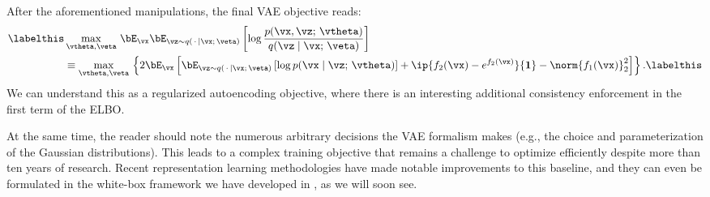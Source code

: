 \documentclass[../../book-main.tex]{subfiles}
\begin{document}
After the aforementioned manipulations, the final VAE objective reads:
\begin{align*}\labelthis\label{eq:elbo-objective}
    &\max_{\vtheta, \veta}\,
    \bE_{\vx}
    \bE_{\vz \sim q(\,\cdot\, \mid \vx ;\, \veta)} \left[
        \log \frac{p(\vx, \vz;\, \vtheta)}{q(\vz \mid \vx;\, \veta)}
    \right]\\
    &\equiv
    \max_{\vtheta, \veta}\,
    \left\{
        2\bE_{\vx}\left[
            \bE_{\vz \sim q(\,\cdot\, \mid \vx ;\, \veta)} \left[
                \log p(\vx \mid \vz;\, \vtheta)
            \right]
            + \ip{ f_2(\vx) - e^{f_2(\vx)}}{\mathbf{1}}
            - \norm{f_1(\vx)}_2^2
        \right]
    \right\}. \labelthis \label{eq:elbo-for-gaussians}
\end{align*}
We can understand this as a regularized autoencoding objective, where there is
an interesting additional consistency enforcement in the first term of the ELBO.

At the same time, the reader should note the numerous arbitrary decisions
the VAE formalism makes (e.g., the choice and parameterization of the Gaussian
distributions). This leads to a complex training objective that remains
a challenge to optimize efficiently despite more than ten years of research.
Recent representation learning methodologies have made notable improvements to
this baseline, and they can even be formulated in the white-box framework we
have developed in , as we will soon see.

\end{document}
